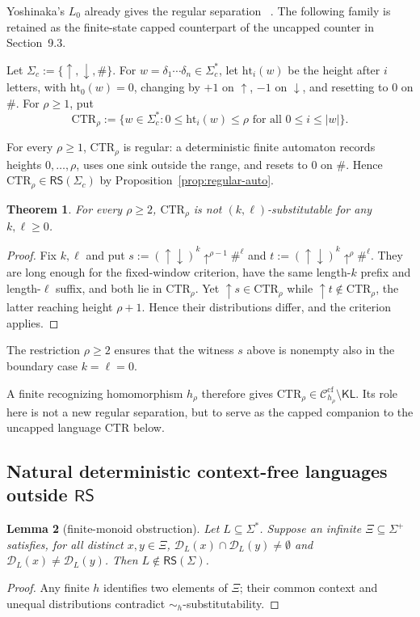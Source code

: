 \documentclass[11pt,a4paper]{article}
\newtheorem{theorem}{Theorem}[section]
\newtheorem{lemma}[theorem]{Lemma}
\theoremstyle{remark}
\theoremstyle{plain}
\newcommand{\D}{\mathcal{D}}
\newcommand{\cf}{\mathrm{cf}}
\newcommand{\Ccf}[1]{\mathcal C_{#1}^{\cf}}
\begin{document}
Yoshinaka's $L_0$ already gives the regular separation
~\cite[Proposition~1]{yoshinaka2008}.  The following family is retained as
the finite-state capped counterpart of the uncapped counter in Section~9.3.

Let $\Sigma_c:=\{\uparrow,\downarrow,\#\}$.  For
$w=\delta_1\cdots\delta_n\in\Sigma_c^*$, let $\mathrm{ht}_i(w)$
be the height after $i$ letters, with $\mathrm{ht}_0(w)=0$, changing
by $+1$ on $\uparrow$, $-1$ on $\downarrow$, and resetting to $0$ on $\#$.
For $\rho\ge1$, put
\[
\mathrm{CTR}_\rho:=
\{w\in\Sigma_c^*:0\le\mathrm{ht}_i(w)\le\rho
\text{ for all }0\le i\le|w|\}.
\]

For every $\rho\ge1$, $\mathrm{CTR}_\rho$ is regular: a deterministic
finite automaton records
heights $0,\ldots,\rho$, uses one sink outside the range, and resets to $0$
on $\#$.  Hence $\mathrm{CTR}_\rho\in\mathsf{RS}(\Sigma_c)$ by
Proposition~\ref{prop:regular-auto}.

\begin{theorem}\label{thm:ctr-non-kl}
For every $\rho\ge2$, $\mathrm{CTR}_\rho$ is not
$(k,\ell)$-substitutable for any $k,\ell\ge0$.
\end{theorem}
\begin{proof}
Fix $k,\ell$ and put
$s:=(\uparrow\downarrow)^k\uparrow^{\rho-1}\#^\ell$ and
$t:=(\uparrow\downarrow)^k\uparrow^\rho\#^\ell$.  They are long
enough for the fixed-window criterion, have the same length-$k$ prefix and
length-$\ell$ suffix, and both lie in $\mathrm{CTR}_\rho$.  Yet
$\uparrow s\in\mathrm{CTR}_\rho$ while
$\uparrow t\notin\mathrm{CTR}_\rho$, the latter reaching height
$\rho+1$.  Hence their distributions differ, and the criterion applies.
\end{proof}

The restriction $\rho\ge2$ ensures that the witness $s$ above is nonempty
also in the boundary case $k=\ell=0$.

A finite recognizing homomorphism $h_\rho$ therefore gives
$\mathrm{CTR}_\rho\in\Ccf{h_\rho}\setminus\mathsf{KL}$.
Its role here is not a new regular separation, but to serve as the capped
companion to the uncapped language $\mathrm{CTR}$ below.

\subsection{Natural deterministic context-free languages outside \texorpdfstring{$\mathsf{RS}$}{RS}}

\begin{lemma}[finite-monoid obstruction]\label{lem:finite-monoid-obstruction}
Let $L\subseteq\Sigma^*$.  Suppose an infinite
$\Xi\subseteq\Sigma^+$ satisfies, for all distinct $x,y\in\Xi$,
$\D_L(x)\cap\D_L(y)\ne\emptyset$ and
$\D_L(x)\ne\D_L(y)$.  Then $L\notin\mathsf{RS}(\Sigma)$.
\end{lemma}
\begin{proof}
Any finite $h$ identifies two elements of $\Xi$; their common context and
unequal distributions contradict $\sim_h$-substitutability.
\end{proof}
\end{document}
